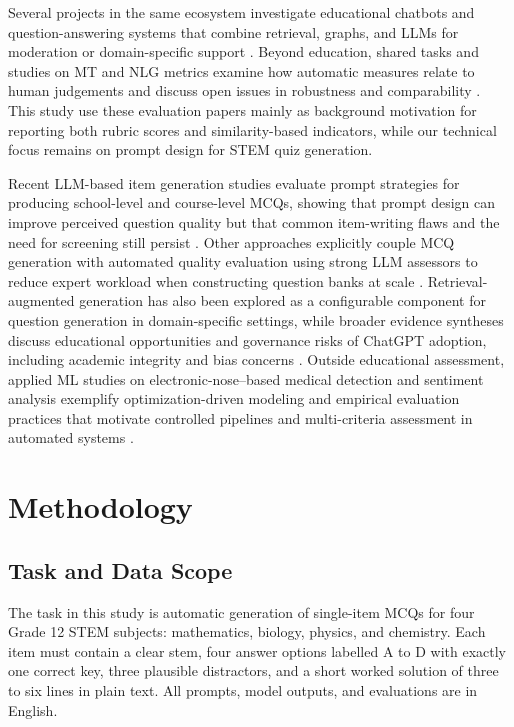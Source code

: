 \documentclass[a4paper,conference]{IEEEtran}
\begin{document}
Several projects in the same ecosystem investigate educational chatbots and question-answering systems that combine retrieval, graphs, and LLMs for moderation or domain-specific support \cite{hartawanLBE,lukmanLBE,nuraisyahLBE}. Beyond education, shared tasks and studies on MT and NLG metrics examine how automatic measures relate to human judgements and discuss open issues in robustness and comparability \cite{wmt21metrics,acl2024Eval,acmEval3,evalNLP2023}. This study use these evaluation papers mainly as background motivation for reporting both rubric scores and similarity-based indicators, while our technical focus remains on prompt design for STEM quiz generation.

Recent LLM-based item generation studies evaluate prompt strategies for producing school-level and course-level MCQs, showing that prompt design can improve perceived question quality but that common item-writing flaws and the need for screening still persist \cite{maity2025,tran2023,arif2024}. 
Other approaches explicitly couple MCQ generation with automated quality evaluation using strong LLM assessors to reduce expert workload when constructing question banks at scale \cite{mucciaccia2025}. 
Retrieval-augmented generation has also been explored as a configurable component for question generation in domain-specific settings, while broader evidence syntheses discuss educational opportunities and governance risks of ChatGPT adoption, including academic integrity and bias concerns \cite{aisyah2024generating,munaye2025}. 
Outside educational assessment, applied ML studies on electronic-nose--based medical detection and sentiment analysis exemplify optimization-driven modeling and empirical evaluation practices that motivate controlled pipelines and multi-criteria assessment in automated systems \cite{sarno2020electronic,aulia2023optimization,firmanto2018prediction,khotimah2019sentiment}.


\section{Methodology}

\subsection{Task and Data Scope}

The task in this study is automatic generation of single-item MCQs for four Grade 12 STEM subjects: mathematics, biology, physics, and chemistry. Each item must contain a clear stem, four answer options labelled A to D with exactly one correct key, three plausible distractors, and a short worked solution of three to six lines in plain text. All prompts, model outputs, and evaluations are in English.
\end{document}
